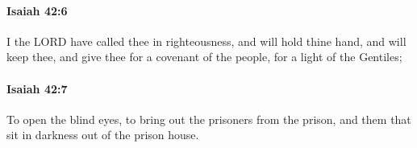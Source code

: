 		\paragraph{Isaiah 42:6} %
			\label{ISAIAH-42-6}

			I the LORD have called thee in righteousness, and will hold thine hand, and will keep thee, and give thee for a covenant of the people, for a light of the Gentiles;


		\paragraph{Isaiah 42:7} %
			\label{ISAIAH-42-7}

			To open the blind eyes, to bring out the prisoners from the prison, and them that sit in darkness out of the prison house.


